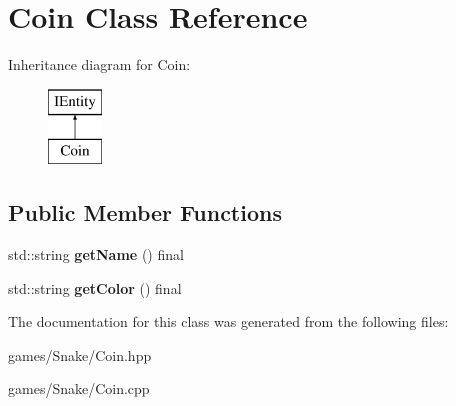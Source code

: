 \hypertarget{class_coin}{}\section{Coin Class Reference}
\label{class_coin}
Inheritance diagram for Coin\+:\begin{figure}[H]
\begin{center}
\leavevmode
\includegraphics[height=2.000000cm]{class_coin}
\end{center}
\end{figure}
\subsection*{Public Member Functions}
\begin{DoxyCompactItemize}
\item 
\mbox{\label{class_coin_a5cf3ac1d050f0a6719cda865a64bfd50}} 
std\+::string {\bfseries get\+Name} () final
\item 
\mbox{\label{class_coin_a337dd575cb8929d5f4f270edc18ac977}} 
std\+::string {\bfseries get\+Color} () final
\end{DoxyCompactItemize}


The documentation for this class was generated from the following files\+:\begin{DoxyCompactItemize}
\item 
games/\+Snake/Coin.\+hpp\item 
games/\+Snake/Coin.\+cpp\end{DoxyCompactItemize}
